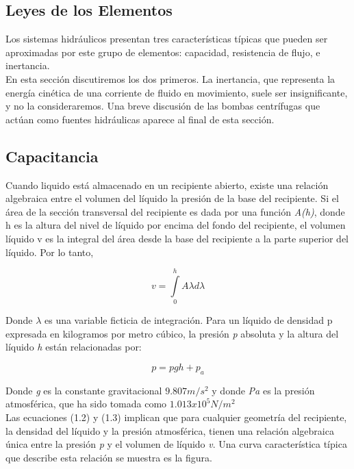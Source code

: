 \documentclass[a4paper,12pt,twoside]{proyectotanquesecci}
\begin{document}
\subsection{Leyes de los Elementos}

Los sistemas hidráulicos presentan tres características típicas que pueden ser aproximadas por este grupo de elementos: capacidad, resistencia de flujo, e inertancia.\\

En esta sección discutiremos los dos primeros. La inertancia, que representa la energía cinética de una corriente de fluido en movimiento, suele ser insignificante, y no la consideraremos. Una breve discusión de las bombas centrífugas que actúan como fuentes hidráulicas aparece al final de esta sección.\\

\subsection{Capacitancia}

Cuando liquido está almacenado en un recipiente abierto, existe una relación algebraica entre el volumen del líquido la presión de la base del recipiente. Si el área de la sección transversal del recipiente es dada por una función \textit{A(h)}, donde h es la altura del nivel de líquido por encima del fondo del recipiente, el volumen líquido v  es la integral del área desde la base del recipiente a la parte superior del líquido. 
Por lo tanto,

\begin{equation}
v=\int \limits_{0}^{h} A{\lambda}d{\lambda}
\label{Ecu 2}
\end{equation}

Donde $ {\lambda} $ es una variable ficticia de integración. Para un líquido de densidad p expresada en kilogramos por metro cúbico, la presión \textit{p} absoluta y la altura del líquido \textit{h} están relacionadas por:

\begin{equation}
p=pgh+p_{a}
\label{Ecu 3}
\end{equation}

Donde \textit{g} es la constante gravitacional ${9.807 m/s^{2}}$ y donde \textit{Pa} es la presión atmosférica, que ha sido tomada como ${1.013 x 10^{5}  N/m^{2}}$\\

Las ecuaciones (1.2) y (1.3) implican que para cualquier geometría del recipiente, la densidad del líquido y la presión atmosférica, tienen una relación algebraica única entre la presión \textit{p} y el volumen de líquido \textit{v}. Una curva característica típica que describe esta relación se muestra es la figura.
\end{document}
